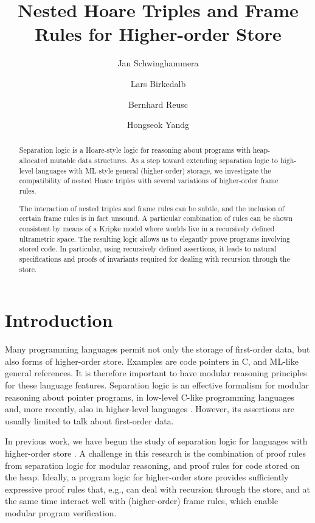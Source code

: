 \documentclass{LMCS}
\title[Nested Hoare Triples and Frame Rules for Higher-order Store]{Nested Hoare Triples and Frame Rules for Higher-order Store\rsuper*}
\author[J.~Schwinghammer]{Jan Schwinghammer\rsuper a}
\author[L.~Birkedal]{Lars Birkedal\rsuper b}
\author[B.~Reus]{Bernhard Reus\rsuper c}
\author[H.~Yang]{Hongseok Yan\rsuper dg}
\theoremstyle{remark}
\begin{document}
\begin{abstract}
\noindent
Separation logic is a Hoare-style logic for reasoning about programs with heap-allocated mutable data structures.  
As a step toward extending separation logic to high-level languages with ML-style general (higher-order) storage, we investigate the compatibility of nested Hoare triples with several variations of higher-order frame rules. 

The interaction of nested triples and frame rules can be subtle, and the inclusion of certain  frame rules is in fact unsound. 
A particular combination of rules can be shown consistent by means of a Kripke model where worlds live in a recursively defined ultrametric space. 
The resulting logic allows us to elegantly prove programs involving stored code. In particular, using recursively defined assertions, it leads to natural specifications and proofs of invariants  required for dealing with recursion through the store.
\end{abstract}


\maketitle


\section{Introduction}
\label{sec:intro}

Many programming languages permit not only the storage of first-order data, but also forms of higher-order store. Examples are code pointers in C, and ML-like general references. 
It is therefore important to have modular reasoning principles for these language features. 
Separation logic is  an effective formalism for modular reasoning about pointer programs, in low-level C-like programming languages and, more recently, also in higher-level languages 
\cite{Krishnaswami:ML-SL07,Nanevski:Morrisett:Shinnar:Govereau:Birkedal:08,Parkinson:Biermann:08,Reynolds:02a}.
However, its assertions are usually limited to talk about first-order data. 

In previous work, we have begun the study of separation logic for languages with higher-order store \cite{Birkedal:Reus:Schwinghammer:Yang:08,Reus:Schwinghammer:06}. A challenge in this research is the combination of proof rules from separation logic for  modular reasoning, and proof rules for code stored on the heap. 
 Ideally, a program logic for higher-order store provides sufficiently expressive proof rules that, e.g., can deal with recursion through the store, and at the same time interact well with (higher-order) frame rules, which enable modular program verification. 
\end{document}
